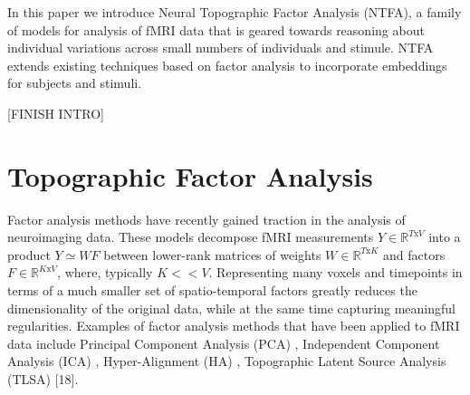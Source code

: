 \documentclass{article}
\begin{document}
In this paper we introduce Neural Topographic Factor Analysis (NTFA), a family of models for analysis of fMRI data that is geared towards reasoning about individual variations across small numbers of individuals and stimule. NTFA extends existing techniques based on factor analysis to incorporate embeddings for subjects and stimuli. 

[FINISH INTRO]

\section{Topographic Factor Analysis}

 
 Factor analysis methods have recently gained traction in the analysis of neuroimaging data. These models decompose fMRI measurements $Y \in \mathbb{R}^{T\text{x}V}$ into a product $Y \simeq W F$ between lower-rank matrices of weights $W \in \mathbb{R}^{T\text{x}K}$ and factors $F \in \mathbb{R}^{K\text{x}V}$, where, typically $K<<V$. Representing many voxels and timepoints in terms of a much smaller set of spatio-temporal factors greatly reduces the dimensionality of the original data, while at the same time capturing meaningful regularities. Examples of factor analysis methods that have been applied to fMRI data include Principal Component Analysis (PCA) \cite{abdi2010principal}, Independent Component Analysis (ICA) \cite{hyvarinen2001independent}, Hyper-Alignment (HA) \cite{haxby2011common}, Topographic Latent Source Analysis (TLSA) [18]. %
\end{document}
